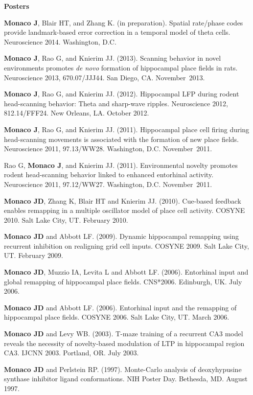 \documentclass[10pt]{article}
\begin{document}
\begin{description}
\item \textbf{Posters}
\item[\quad] \textbf{Monaco J}, Blair HT, and Zhang K. (in preparation). Spatial rate/phase codes provide landmark-based error correction in a temporal model of theta cells. Neuroscience 2014. Washington, D.C.
\item[\quad] \textbf{Monaco J}, Rao G, and Knierim JJ. (2013). Scanning behavior in novel environments promotes \emph{de novo} formation of hippocampal place fields in rats. Neuroscience 2013, 670.07/JJJ44. San Diego, CA. November~2013.
\item[\quad] \textbf{Monaco J}, Rao G, and Knierim JJ. (2012). Hippocampal LFP during rodent head-scanning behavior: Theta and sharp-wave ripples. Neuroscience 2012, 812.14/FFF24. New Orleans, LA. October 2012.
\item[\quad] \textbf{Monaco J}, Rao G, and Knierim JJ. (2011). Hippocampal place cell firing during head-scanning movements is associated with the formation of new place fields. Neuroscience 2011, 97.13/WW28. Washington, D.C. November~2011.
\item[\quad] Rao G, \textbf{Monaco J}, and Knierim JJ. (2011). Environmental novelty promotes rodent head-scanning behavior linked to enhanced entorhinal activity. Neuroscience 2011, 97.12/WW27. Washington, D.C. November~2011.
\item[\quad] \textbf{Monaco JD}, Zhang K, Blair HT and Knierim JJ. (2010). Cue-based feedback enables remapping in a multiple oscillator model of place cell activity. COSYNE 2010. Salt Lake City, UT. February 2010.
\item[\quad] \textbf{Monaco JD} and Abbott LF. (2009). Dynamic hippocampal remapping using recurrent inhibition on realigning grid cell inputs. COSYNE 2009. Salt Lake City, UT. February 2009.
\item[\quad] \textbf{Monaco JD}, Muzzio IA, Levita L and Abbott LF. (2006). Entorhinal input and global remapping of hippocampal place fields. CNS*2006. Edinburgh, UK. July 2006.
\item[\quad] \textbf{Monaco JD} and Abbott LF. (2006). Entorhinal input and the remapping of hippocampal place fields. COSYNE 2006. Salt Lake City, UT. March 2006.
\item[\quad] \textbf{Monaco JD} and Levy WB. (2003). T-maze training of a recurrent CA3 model reveals the necessity of novelty-based modulation of LTP in hippocampal region CA3. IJCNN 2003. Portland, OR. July 2003.
\item[\quad] \textbf{Monaco JD} and Perlstein RP. (1997). Monte-Carlo analysis of deoxyhypusine synthase inhibitor ligand conformations. NIH Poster Day. Bethesda, MD. August 1997. 
\end{description}
\end{document}
